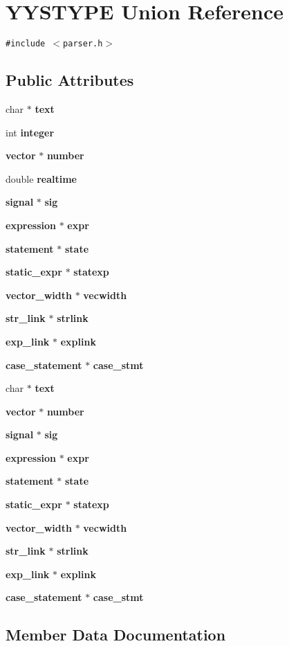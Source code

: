 \section{YYSTYPE  Union Reference}
\label{unionYYSTYPE}
{\tt \#include $<$parser.h$>$}

\subsection*{Public Attributes}
\begin{CompactItemize}
\item 
char $\ast$ {\bf text}
\item 
int {\bf integer}
\item 
{\bf vector} $\ast$ {\bf number}
\item 
double {\bf realtime}
\item 
{\bf signal} $\ast$ {\bf sig}
\item 
{\bf expression} $\ast$ {\bf expr}
\item 
{\bf statement} $\ast$ {\bf state}
\item 
{\bf static\_\-expr} $\ast$ {\bf statexp}
\item 
{\bf vector\_\-width} $\ast$ {\bf vecwidth}
\item 
{\bf str\_\-link} $\ast$ {\bf strlink}
\item 
{\bf exp\_\-link} $\ast$ {\bf explink}
\item 
{\bf case\_\-statement} $\ast$ {\bf case\_\-stmt}
\item 
char $\ast$ {\bf text}
\item 
{\bf vector} $\ast$ {\bf number}
\item 
{\bf signal} $\ast$ {\bf sig}
\item 
{\bf expression} $\ast$ {\bf expr}
\item 
{\bf statement} $\ast$ {\bf state}
\item 
{\bf static\_\-expr} $\ast$ {\bf statexp}
\item 
{\bf vector\_\-width} $\ast$ {\bf vecwidth}
\item 
{\bf str\_\-link} $\ast$ {\bf strlink}
\item 
{\bf exp\_\-link} $\ast$ {\bf explink}
\item 
{\bf case\_\-statement} $\ast$ {\bf case\_\-stmt}
\end{CompactItemize}


\subsection{Member Data Documentation}
